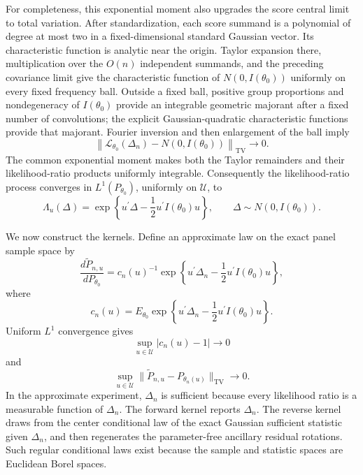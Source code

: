 For completeness, this exponential moment also upgrades the score central limit to total variation.  After standardization, each score summand is a polynomial of degree at most two in a fixed-dimensional standard Gaussian vector.  Its characteristic function is analytic near the origin.  Taylor expansion there, multiplication over the \(O(n)\) independent summands, and the preceding covariance limit give the characteristic function of \(N(0,I(\theta_0))\) uniformly on every fixed frequency ball.  Outside a fixed ball, positive group proportions and nondegeneracy of \(I(\theta_0)\) provide an integrable geometric majorant after a fixed number of convolutions; the explicit Gaussian-quadratic characteristic functions provide that majorant.  Fourier inversion and then enlargement of the ball imply
\[
\left\|
\mathcal L_{\theta_0}(\Delta_n)-N(0,I(\theta_0))
\right\|_{\mathrm{TV}}\longrightarrow0.
\]
The common exponential moment makes both the Taylor remainders and their likelihood-ratio products uniformly integrable.  Consequently the likelihood-ratio process converges in \(L^1(P_{\theta_0})\), uniformly on \(\mathcal U\), to
\[
\Lambda_u(\Delta)
=\exp\!\left\{
u^{\prime}\Delta-\frac12u^{\prime}I(\theta_0)u
\right\},
\qquad
\Delta\sim N(0,I(\theta_0)).
\]

We now construct the kernels.  Define an approximate law on the exact panel sample space by
\[
\frac{d\widetilde P_{n,u}}{dP_{\theta_0}}
=c_n(u)^{-1}
\exp\!\left\{
u^{\prime}\Delta_n-\frac12u^{\prime}I(\theta_0)u
\right\},
\]
where
\[
c_n(u)=E_{\theta_0}
\exp\!\left\{
u^{\prime}\Delta_n-\frac12u^{\prime}I(\theta_0)u
\right\}.
\]
Uniform \(L^1\) convergence gives
\[
\sup_{u\in\mathcal U}|c_n(u)-1|\longrightarrow0
\]
and
\[
\sup_{u\in\mathcal U}
\lVert\widetilde P_{n,u}-P_{\theta_n(u)}\rVert_{\mathrm{TV}}
\longrightarrow0.
\]
In the approximate experiment, \(\Delta_n\) is sufficient because every likelihood ratio is a measurable function of \(\Delta_n\).  The forward kernel reports \(\Delta_n\).  The reverse kernel draws from the center conditional law of the exact Gaussian sufficient statistic given \(\Delta_n\), and then regenerates the parameter-free ancillary residual rotations.  Such regular conditional laws exist because the sample and statistic spaces are Euclidean Borel spaces.

